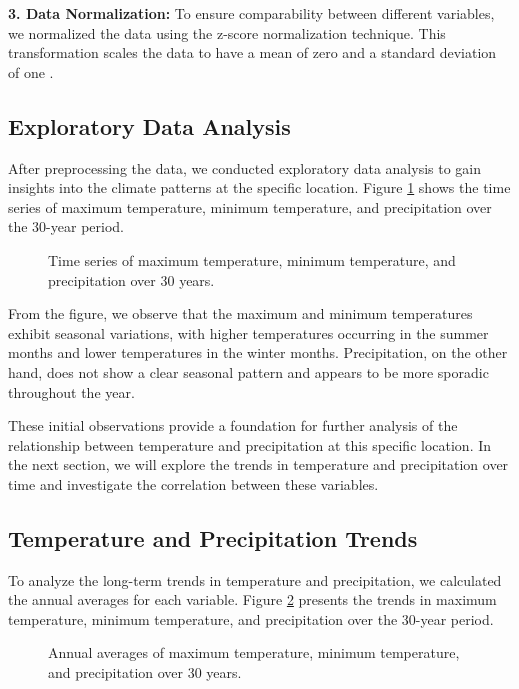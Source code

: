 \documentclass{article}
\begin{document}
\textbf{3. Data Normalization:} To ensure comparability between different variables, we normalized the data using the z-score normalization technique. This transformation scales the data to have a mean of zero and a standard deviation of one \cite{wilcox2017introduction}.

\subsection{Exploratory Data Analysis}
After preprocessing the data, we conducted exploratory data analysis to gain insights into the climate patterns at the specific location. Figure \ref{fig:temperature_precipitation} shows the time series of maximum temperature, minimum temperature, and precipitation over the 30-year period.

\begin{figure}[h]
  \centering
  \caption{Time series of maximum temperature, minimum temperature, and precipitation over 30 years.}
  \label{fig:temperature_precipitation}
\end{figure}

From the figure, we observe that the maximum and minimum temperatures exhibit seasonal variations, with higher temperatures occurring in the summer months and lower temperatures in the winter months. Precipitation, on the other hand, does not show a clear seasonal pattern and appears to be more sporadic throughout the year.

These initial observations provide a foundation for further analysis of the relationship between temperature and precipitation at this specific location. In the next section, we will explore the trends in temperature and precipitation over time and investigate the correlation between these variables.

\subsection{Temperature and Precipitation Trends}
To analyze the long-term trends in temperature and precipitation, we calculated the annual averages for each variable. Figure \ref{fig:annual_averages} presents the trends in maximum temperature, minimum temperature, and precipitation over the 30-year period.

\begin{figure}[h]
  \centering
  \caption{Annual averages of maximum temperature, minimum temperature, and precipitation over 30 years.}
  \label{fig:annual_averages}
\end{figure}
\end{document}
